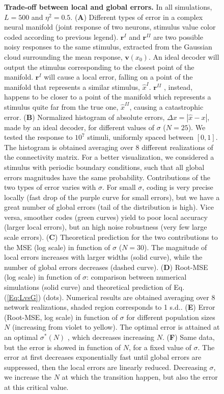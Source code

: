\documentclass[a4paper]{article}%
\begin{document}
\begin{figure}[ptb]
\centering
{}\caption{ \textbf{Trade-off
between local and global errors.} In all simulations, $L=500$ and $\eta^{2} =
0.5$. (\textbf{A}) Different types of error in a complex neural manifold
(joint response of two neurons, stimulus value color coded according to
previous legend). $\mathbf{r}^{I}$ and $\mathbf{r}^{II}$ are two possible
noisy responses to the same stimulus, extracted from the Gaussian cloud
surrounding the mean response, $\mathbf{v}(x_{0})$. An ideal decoder will
output the stimulus corresponding to the closest point of the manifold.
$\mathbf{r}^{I}$ will cause a local error, falling on a point of the manifold
that represents a similar stimulus, $\hat{x}^{I}$. $\mathbf{r}^{II}$ ,
instead, happens to be closer to a point of the manifold which represents a
stimulus quite far from the true one, $\hat{x}^{II}$, causing a catastrophic
error. (\textbf{B}) Normalized histogram of absolute errors, $\Delta x =
|\hat{x}-x|$, made by an ideal decoder, for different values of $\sigma$
($N=25$). We tested the response to $10^{7}$ stimuli, uniformly spaced between
$[0,1]$. The histogram is obtained averaging over 8 different realizations of
the connectivity matrix. For a better visualization, we considered a stimulus
with periodic boundary conditions, such that all global errors magnitudes have
the same probability. Contributions of the two types of error varies with
$\sigma$. For small $\sigma$, coding is very precise locally (fast drop of the
purple curve for small errors), but we have a great number of global errors
(tail of the distribution is high). Vice versa, smoother codes (green
curves) yield to poor local accuracy (larger local errors), but an high noise
robustness (very few large scale errors). (\textbf{C}) Theoretical prediction
for the two contributions to the MSE (log scale) in function of $\sigma$
($N=30$). The magnitude of local errors increases with larger widths (solid
curve), while the number of global errors decreases (dashed curve).
(\textbf{D}) Root-MSE (log scale) in function of $\sigma$: comparison between
numerical simulations (solid curve) and theoretical prediction of
Eq.(\ref{Eq:LvsG}) (dots). Numerical results are obtained averaging over 8
network realizations, shaded region corresponds to 1 s.d..
 (\textbf{E}) Error (Root-MSE,
log scale) in function of $\sigma$ for different population sizes $N$
(increasing from violet to yellow). The optimal error is attained at an
optimal $\sigma^{*}(N)$ , which decreases increasing $N$. (\textbf{F}) Same
data, but the error is showed in function of $N$, for a fixed value of
$\sigma$. The error at first decreases exponentially fast until global errors
are suppressed, then the local errors are linearly reduced. Decreasing
$\sigma$, we increase the $N$ at which the transition happen, but also the
error at this critical value. }
\label{Fig:3}
\end{figure}\clearpage
\end{document}

